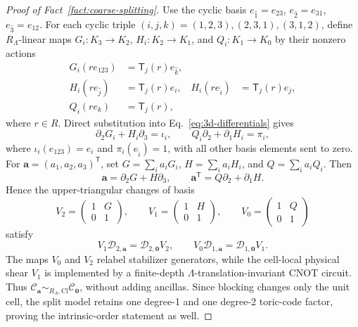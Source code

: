 \documentclass[aps,prx,english,superscriptaddress,twocolumn,tightenlines,showpacs,longbibliography,floatfix,amsfonts]{revtex4-2}
\theoremstyle{remark}
\theoremstyle{definition}
\begin{document}
\begin{proof}[Proof of Fact~\ref{fact:coarse-splitting}]
	Use the cyclic basis
	\(e_{\hat1}=e_{23}\), \(e_{\hat2}=e_{31}\),
	\(e_{\hat3}=e_{12}\). For each cyclic triple
	\((i,j,k)=(1,2,3),(2,3,1),(3,1,2)\), define \(R_\Lambda\)-linear maps
	\(G_i\colon K_3\to K_2\),
	\(H_i\colon K_2\to K_1\), and
	\(Q_i\colon K_1\to K_0\) by their nonzero actions
	\begin{equation}
		\begin{aligned}
			G_i(r e_{123})
			&=\mathsf T_j(r)e_{\hat{k}},\\
			H_i(r e_{\hat{j}})
			&=\mathsf T_j(r)e_i,
			&
			H_i(r e_{\hat{i}})
			&=\mathsf T_j(r)e_j,\\
			Q_i(r e_k)&=\mathsf T_j(r),
		\end{aligned}
	\end{equation}
	where \(r\in R\). Direct substitution into
	Eq.~\eqref{eq:3d-differentials} gives
	\begin{equation}
		\partial_2G_i+H_i\partial_3=\iota_i,
		\qquad
		Q_i\partial_2+\partial_1H_i=\pi_i,
	\end{equation}
	where \(\iota_i(e_{123})=e_i\) and \(\pi_i(e_{\hat i})=1\), with all
	other basis elements sent to zero.
	For \(\mathbf a=(a_1,a_2,a_3)^{\mathsf T}\), set
	\(G=\sum_i a_iG_i\), \(H=\sum_i a_iH_i\), and
	\(Q=\sum_i a_iQ_i\). Then
	\begin{equation}
		\mathbf a=\partial_2G+H\partial_3,
		\qquad
		\mathbf a^{\mathsf T}=Q\partial_2+\partial_1H.
	\end{equation}
	Hence the upper-triangular changes of basis
	\begin{equation}
		V_2=\begin{pmatrix}1&G\\0&1\end{pmatrix},
		\qquad
		V_1=\begin{pmatrix}1&H\\0&1\end{pmatrix},
		\qquad
		V_0=\begin{pmatrix}1&Q\\0&1\end{pmatrix}
	\end{equation}
	satisfy
	\begin{equation}
		V_1\mathcal D_{2,\mathbf a}
		=\mathcal D_{2,\mathbf0}V_2,
		\qquad
		V_0\mathcal D_{1,\mathbf a}
		=\mathcal D_{1,\mathbf0}V_1.
	\end{equation}
	The maps \(V_0\) and \(V_2\) relabel stabilizer generators, while the
	cell-local physical shear \(V_1\) is implemented by a finite-depth
	\(\Lambda\)-translation-invariant CNOT circuit. Thus
	\(\mathcal C_{\mathbf a}\sim_{R_{\Lambda},\mathrm{Cl}}
	\mathcal C_{\mathbf0}\), without adding ancillas.
	Since blocking changes only the unit cell, the split model retains one
	degree-1 and one degree-2 toric-code factor, proving the intrinsic-order
	statement as well.
\end{proof}




\end{document}
